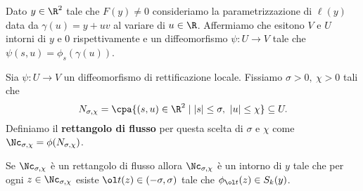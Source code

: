 \begin{lemma}\label{LemmaRettificazioneLocale}
Dato $y\in\R^2$ tale che $F(y)\neq 0$ consideriamo la parametrizzazione di $\ell(y)$ data da $\gamma(u)=y+uv$ al variare di $u\in\R$.
Affermiamo che esitono $V$ e $U$ intorni di $y$ e $0$ rispettivamente e un diffeomorfismo $\psi:U\to V$ tale che $\psi(s,u)=\phi_s(\gamma(u))$.
\end{lemma}

\begin{definition}
Sia $\psi:U\to V$ un diffeomorfismo di rettificazione locale. Fissiamo $\sigma>0,\ \chi>0$ tali che
\[N_{\sigma,\chi}=\cpa{(s,u)\in \R^2\mid |s|\leq \sigma,\ |u|\leq \chi}\subseteq U.\]
Definiamo il \textbf{rettangolo di flusso} per questa scelta di $\sigma$ e $\chi$ come $\Nc_{\sigma,\chi}=\phi(N_{\sigma,\chi})$.
\end{definition}

\begin{lemma}
Se $\Nc_{\sigma,\chi}$ \`e un rettangolo di flusso allora $\Nc_{\sigma,\chi}$ \`e un intorno di $y$ tale che per ogni $z\in \Nc_{\sigma,\chi}$ esiste $\ol t(z)\in (-\sigma,\sigma)$ tale che $\phi_{\ol t}(z)\in S_k(y)$.
\end{lemma}

